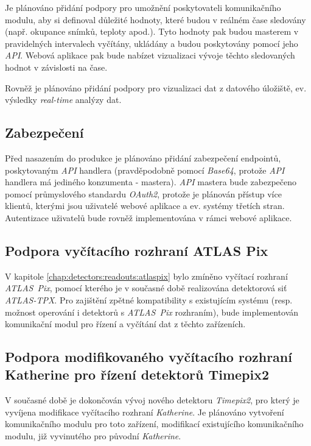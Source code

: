 Je plánováno přidání podpory pro umožnění poskytovateli komunikačního modulu, aby si definoval důležité hodnoty, které budou v reálném čase sledovány (např. okupance snímků, teploty apod.). Tyto hodnoty pak budou masterem v pravidelných intervalech vyčítány, ukládány a budou poskytovány pomocí jeho \textit{API}. Webová aplikace pak bude nabízet vizualizaci vývoje těchto sledovaných hodnot v závislosti na čase.

Rovněž je plánováno přidání podpory pro vizualizaci dat z datového úložiště, ev. výsledky \textit{real-time} analýzy dat.

\subsection{Zabezpečení}
Před nasazením do produkce je plánováno přidání zabezpečení endpointů, poskytovaným \textit{API} handlera (pravděpodobně pomocí \textit{Base64}, protože \textit{API} handlera má jediného konzumenta - mastera). \textit{API} mastera bude zabezpečeno pomocí průmyslového standardu \textit{OAuth2}, protože je plánován přístup více klientů, kterými jsou uživatelé webové aplikace a ev. systémy třetích stran. Autentizace uživatelů bude rovněž implementována v rámci webové aplikace.

\subsection{Podpora vyčítacího rozhraní ATLAS Pix}
V kapitole \ref{chap:detectors:readouts:atlaspix} bylo zmíněno vyčítací rozhraní \textit{ATLAS~Pix}, pomocí kterého je v současné době realizována detektorová siť \textit{ATLAS-TPX}. Pro zajištění zpětné kompatibility s existujícím systému (resp. možnost operování i detektorů s \textit{ATLAS~Pix} rozhraním), bude implementován komunikační modul pro řízení a vyčítání dat z těchto zařízeních.

\subsection{Podpora modifikovaného vyčítacího rozhraní Katherine pro řízení detektorů Timepix2}
V současné době je dokončován vývoj nového detektoru \textit{Timepix2}, pro který je vyvíjena modifikace vyčítacího rozhraní \textit{Katherine}. Je plánováno vytvoření komunikačního modulu pro toto zařízení, modifikací existujícího komunikačního modulu, již vyvinutého pro původní \textit{Katherine}.